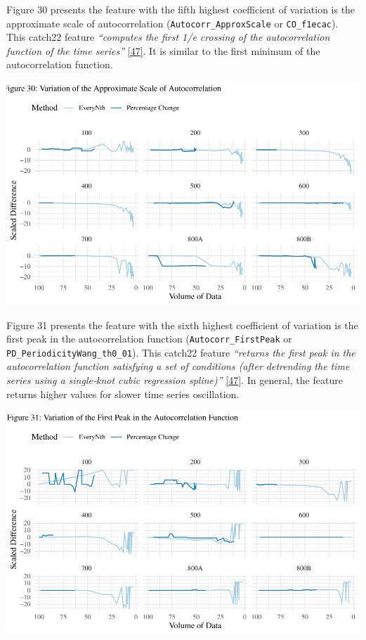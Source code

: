 \documentclass{article}
\begin{document}
Figure 30 presents the feature with the fifth highest coefficient of
variation is the approximate scale of autocorrelation
(\texttt{Autocorr\_ApproxScale} or \texttt{CO\_f1ecac}). This catch22
feature \emph{``computes the first 1/e crossing of the autocorrelation
function of the time series''}
\protect\hyperlink{ref-feature_book}{{[}47{]}}. It is similar to the
first minimum of the autocorrelation function.

\includegraphics{210431461_CSC8639_Dissertation_files/figure-latex/ApproxScale-1.pdf}

Figure 31 presents the feature with the sixth highest coefficient of
variation is the first peak in the autocorrelation function
(\texttt{Autocorr\_FirstPeak} or \texttt{PD\_PeriodicityWang\_th0\_01}).
This catch22 feature \emph{``returns the first peak in the
autocorrelation function satisfying a set of conditions (after
detrending the time series using a single-knot cubic regression
spline)''} \protect\hyperlink{ref-feature_book}{{[}47{]}}. In general,
the feature returns higher values for slower time series oscillation.

\includegraphics{210431461_CSC8639_Dissertation_files/figure-latex/FirstPeak-1.pdf}
\end{document}
